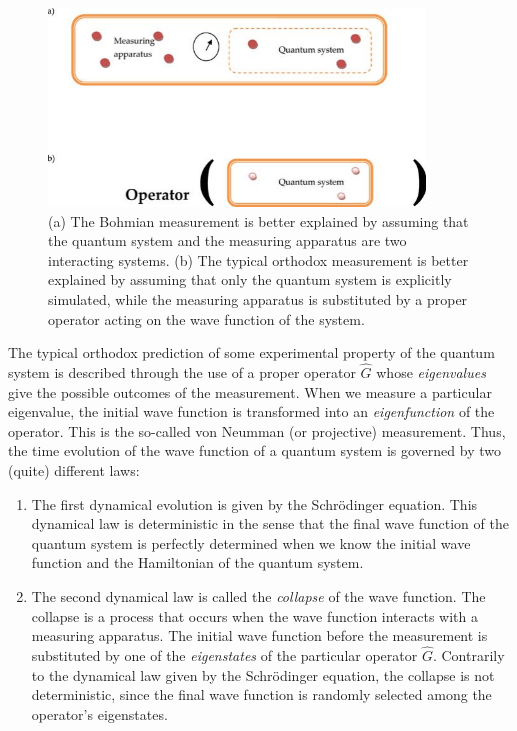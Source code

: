 \documentclass[nofootinbib, secnumarabic, amsmath, nobibnotes,10pt,aps,pra]{revtex4-1}
\begin{document}
\begin{figure}
\centering
\includegraphics[width=10cm]{F1_09.pdf}
\caption{(a) The Bohmian measurement is better explained by assuming that the quantum system and the measuring apparatus are two interacting systems. (b) The typical orthodox measurement is better explained by assuming that only the quantum system is explicitly simulated, while the measuring apparatus is substituted by a proper operator acting on the wave function of the system.}
\label{om_measure2}
\end{figure}

The typical orthodox prediction of some experimental property of the quantum system is described through the use of a proper operator $\hat{G}$ whose \textit{eigenvalues} give the possible outcomes of the measurement. When we measure a particular eigenvalue, the initial wave function is transformed into an \textit{eigenfunction} of the operator. This is the so-called von Neumman (or projective) measurement.
Thus, the time evolution of the wave function of a quantum system is governed by two (quite) different laws:
\begin{enumerate}
\item The first dynamical evolution is given by the Schr\"odinger equation. This dynamical law is deterministic in the sense that the final wave function of the quantum system is perfectly determined when we know the initial wave function and the Hamiltonian of the quantum system.

\item The second dynamical law is called the \textit{collapse} of the wave function. The collapse is a process that occurs when the wave function interacts with a measuring apparatus. The initial wave function before the measurement is substituted by one of the \textit{eigenstates} of the particular operator $\hat{G}$\!. Contrarily to the dynamical law given by the Schr\"odinger equation, the collapse is not deterministic, since the final wave function is randomly selected among the operator's eigenstates.
\end{enumerate}
\end{document}
